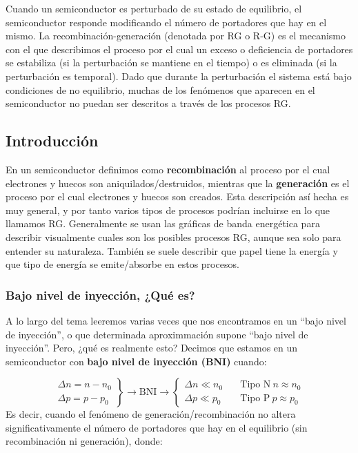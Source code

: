 Cuando un semiconductor es perturbado de su estado de equilibrio, el semiconductor responde modificando el número de portadores que hay en el mismo. La recombinación-generación (denotada por RG o R-G) es el mecanismo con el que describimos el proceso por el cual un exceso o deficiencia de portadores se estabiliza (si la perturbación se mantiene en el tiempo) o es eliminada (si la perturbación es temporal). Dado que durante la perturbación el sistema está bajo condiciones de no equilibrio, muchas de los fenómenos que aparecen en el semiconductor no puedan ser descritos a través de los procesos RG.

\subsection{Introducción}

En un semiconductor definimos como \textbf{recombinación} al proceso por el cual electrones y huecos son aniquilados/destruidos, mientras que la \textbf{generación} es el proceso por el cual electrones y huecos son creados. Esta descripción así hecha es muy general, y por tanto varios tipos de procesos podrían incluirse en lo que llamamos RG. Generalmente se usan las gráficas de banda energética para describir visualmente cuales son los posibles procesos RG, aunque sea solo para entender su naturaleza. También se suele describir que papel tiene la energía y que tipo de energía se emite/absorbe en estos procesos.

\subsubsection{Bajo nivel de inyección, ¿Qué es?}

A lo largo del tema leeremos varias veces que nos encontramos en un ``bajo nivel de inyección'', o que determinada aproximmación supone ``bajo nivel de inyección''. Pero, ¿qué es realmente esto? Decimos que estamos en un semiconductor con \textbf{bajo nivel de inyección (BNI)} cuando:


\begin{equation}
	\left.
	\begin{array}{l}
	\Delta n = n - n_{0}  \\
	\Delta p = p - p_{0} \end{array} \right\rbrace \rightarrow \text{BNI} \rightarrow \left\lbrace \begin{array}{ll}
		\Delta n \ll n_0 & \quad \text{Tipo N} \ n \approx n_0 \\
		\Delta p \ll p_0 & \quad \text{Tipo P} \ p \approx p_0 
	\end{array} \right. 
\end{equation}
Es decir, cuando el fenómeno de generación/recombinación no altera significativamente el número de portadores que hay en el equilibrio (sin recombinación ni generación), donde:


